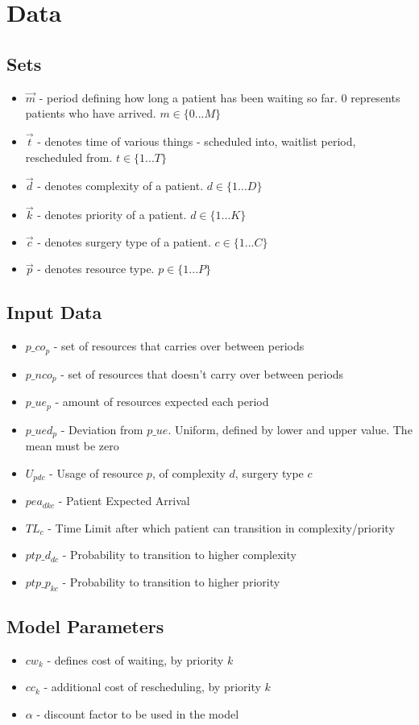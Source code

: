 \section{Data}

\subsection{Sets}
\begin{itemize}
	\item $\vec{m}$ - 
		period defining how long a patient has been waiting so far. 0 represents patients who have arrived. 
		$m \in \{0 ... M\}$
	\item $\vec{t}$ - 
		denotes time of various things - scheduled into, waitlist period, rescheduled from. 
		$t \in \{1 ... T\}$
	\item $\vec{d}$ - 
		denotes complexity of a patient. 
		$d \in \{ 1 ... D \}$
	\item $\vec{k}$ - 
		denotes priority of a patient. 
		$d \in \{ 1 ... K \}$
	\item $\vec{c}$ - 
		denotes surgery type of a patient. 
		$c \in \{ 1 ... C \}$
	\item $\vec{p}$ - 
		denotes resource type. 
		$p \in \{ 1 ... P \}$
\end{itemize}

\subsection{Input Data}
\begin{itemize}
	\item $p\_co_{p}$ - set of resources that carries over between periods
	\item $p\_nco_{p}$ - set of resources that doesn't carry over between periods
	\item $p\_ue_{p}$ - amount of resources expected each period
	\item $p\_ued_{p}$ - Deviation from $p\_ue$. Uniform, defined by lower and upper value. The mean must be zero
	\item $U_{pdc}$ - Usage of resource $p$, of complexity $d$, surgery type $c$
	\item $pea_{dkc}$ - Patient Expected Arrival
	\item $TL_{c}$ - Time Limit after which patient can transition in complexity/priority
	\item $ptp\_d_{dc}$ - Probability to transition to higher complexity
	\item $ptp\_p_{kc}$ - Probability to transition to higher priority
\end{itemize}

\subsection{Model Parameters}
\begin{itemize}
	\item $cw_{k}$ - defines cost of waiting, by priority $k$
	\item $cc_{k}$ - additional cost of rescheduling, by priority $k$ 
	\item $\alpha$ - discount factor to be used in the model
\end{itemize}